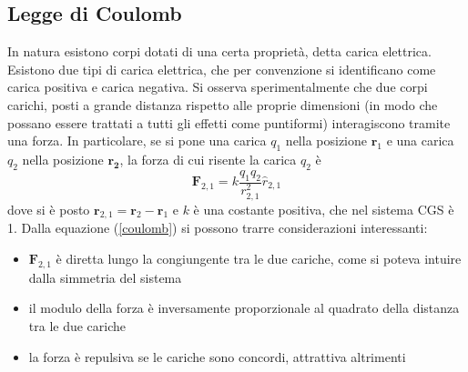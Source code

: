 \documentclass[a4paper,11pt]{book}
\renewcommand{\vec}[1]{\mathbf{#1}}
\theoremstyle{theorem}
\theoremstyle{definition}
\begin{document}
\subsection{Legge di Coulomb}
In natura esistono corpi dotati di una certa proprietà, detta carica elettrica. Esistono due tipi di carica elettrica, che per convenzione si identificano come carica positiva e carica negativa. Si osserva sperimentalmente che due corpi carichi, posti a grande distanza rispetto alle proprie dimensioni (in modo che possano essere trattati a tutti gli effetti come puntiformi) interagiscono tramite una forza. In particolare, se si pone una carica $q_1$ nella posizione $\vec{r}_1$ e una carica $q_2$ nella posizione $\vec{r_2}$, la forza di cui risente la carica $q_2$ è
\begin{equation}
	\label{coulomb}
	\vec{F}_{2,1}=k\frac{q_1q_2}{r_{2,1}^2}\hat{r}_{2,1}
\end{equation}
dove si è posto $\vec{r}_{2,1}=\vec{r}_2-\vec{r}_1$ e $k$ è una costante positiva, che nel sistema CGS è 1. Dalla equazione (\ref{coulomb}) si possono trarre considerazioni interessanti:
\begin{itemize}
	\item $\vec{F}_{2,1}$ è diretta lungo la congiungente tra le due cariche, come si poteva intuire dalla simmetria del sistema
	\item il modulo della forza è inversamente proporzionale al quadrato della distanza tra le due cariche
	\item la forza è repulsiva se le cariche sono concordi, attrattiva altrimenti
\end{itemize}
\end{document}
